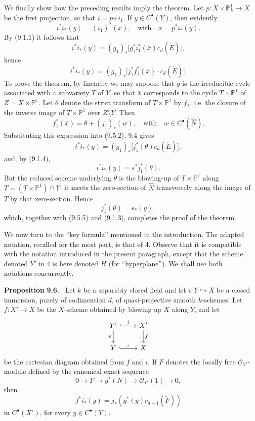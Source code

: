 \documentclass[11pt]{article}
\newenvironment{statement}[1]{\par\medskip\noindent\textbf{#1.}\ }{\par\medskip}
\begin{document}
We finally show how the preceding results imply the theorem. Let $p:X\times\mathbb P^1_k\to X$ be the first projection, so that $i=p\circ i_1$. If $y\in C^{\bullet}(Y)$, then evidently
\[
i^*i_*(y)=(i_1)^*(\bar x),\quad\text{with}\quad \bar x=p^*i_*(y).
\tag{9.5.1}
\]
By (9.1.1) it follows that
\[
i^*i_*(y)=(g_1)_*\bigl[g_1^*i_1^*(\bar x)c_d(\check E)\bigr],
\]
hence
\[
i^*i_*(y)=(g_1)_*\bigl[j_1^*f_1^*(\bar x)\cdot c_d(\check E)\bigr].
\tag{9.5.2}
\]
To prove the theorem, by linearity we may suppose that $y$ is the irreducible cycle associated with a subvariety $T$ of $Y$, so that $\bar x$ corresponds to the cycle $T\times\mathbb P^1$ of $Z=X\times\mathbb P^1$. Let $\theta$ denote the strict transform of $T\times\mathbb P^1$ by $f_1$, i.e. the closure of the inverse image of $T\times\mathbb P^1$ over $Z\setminus Y$. Then
\[
f_1^*(\bar x)=\theta+(j_1)_*(w),\quad\text{with}\quad w\in C^{\bullet}(\widehat N).
\tag{9.5.3}
\]
Substituting this expression into (9.5.2), 9.4 gives
\[
i^*i_*(y)=(g_1)_*\bigl[j_1^*(\theta)c_d(\check E)\bigr],
\tag{9.5.4}
\]
and, by (9.1.4),
\[
i^*i_*(y)=s^*j_1^*(\theta).
\tag{9.5.5}
\]
But the reduced scheme underlying $\theta$ is the blowing-up of $T\times\mathbb P^1$ along $T=(T\times\mathbb P^1)\cap Y$; it meets the zero-section of $\widehat N$ transversely along the image of $T$ by that zero-section. Hence
\[
j_1^*(\theta)=s_*(y),
\]
which, together with (9.5.5) and (9.1.3), completes the proof of the theorem.

We now turn to the ``key formula'' mentioned in the introduction. The adapted notation, recalled for the most part, is that of 4. Observe that it is compatible with the notation introduced in the present paragraph, except that the scheme denoted $Y'$ in 4 is here denoted $H$ (for ``hyperplane''). We shall use both notations concurrently.

\begin{statement}{Proposition 9.6}
Let $k$ be a separably closed field and let $i:Y\hookrightarrow X$ be a closed immersion, purely of codimension $d$, of quasi-projective smooth $k$-schemes. Let $f:X'\to X$ be the $X$-scheme obtained by blowing up $X$ along $Y$, and let
\[
\begin{tikzcd}
Y'\arrow[r,hook,"j"]\arrow[d,"g"']&X'\arrow[d,"f"]\\
Y\arrow[r,hook,"i"]&X
\end{tikzcd}
\]
be the cartesian diagram obtained from $f$ and $i$. If $F$ denotes the locally free $\mathcal O_{Y'}$-module defined by the canonical exact sequence
\[
0\to F\to g^*(N)\to\mathcal O_{Y'}(1)\to0,
\tag{9.6.1}
\]
then
\[
f^*i_*(y)=j_*(g^*(y)c_{d-1}(\check F))
\tag{9.6.2}
\]
in $C^{\bullet}(X')$, for every $y\in C^{\bullet}(Y)$.
\end{statement}
\end{document}
